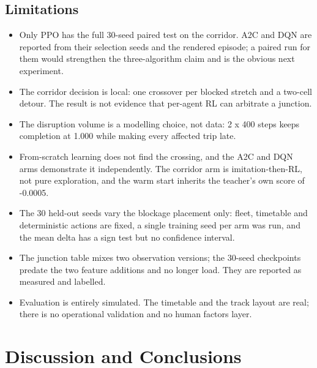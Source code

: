 \documentclass[11pt,a4paper]{article}
\begin{document}
\subsection{Limitations}

\begin{itemize}[leftmargin=*,itemsep=2pt]
\item Only PPO has the full 30-seed paired test on the corridor. A2C and DQN are reported from their selection seeds and the rendered episode; a paired run for them would strengthen the three-algorithm claim and is the obvious next experiment.
\item The corridor decision is local: one crossover per blocked stretch and a two-cell detour. The result is not evidence that per-agent RL can arbitrate a junction.
\item The disruption volume is a modelling choice, not data: 2 x 400 steps keeps completion at 1.000 while making every affected trip late.
\item From-scratch learning does not find the crossing, and the A2C and DQN arms demonstrate it independently. The corridor arm is imitation-then-RL, not pure exploration, and the warm start inherits the teacher's own score of -0.0005.
\item The 30 held-out seeds vary the blockage placement only: fleet, timetable and deterministic actions are fixed, a single training seed per arm was run, and the mean delta has a sign test but no confidence interval.
\item The junction table mixes two observation versions; the 30-seed checkpoints predate the two feature additions and no longer load. They are reported as measured and labelled.
\item Evaluation is entirely simulated. The timetable and the track layout are real; there is no operational validation and no human factors layer.
\end{itemize}

\section{Discussion and Conclusions}
\end{document}
